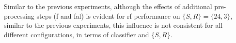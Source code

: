 Similar to the previous experiments, although the effects of additional pre-processing steps (\ac{f} and \ac{fal}) is evident for \ac{rf} performance on $\{S,R\} = \{24,3\}$, similar to the previous experiments, this influence is not consistent for all different configurations, in terms of classifier and $\{S,R\}$.









